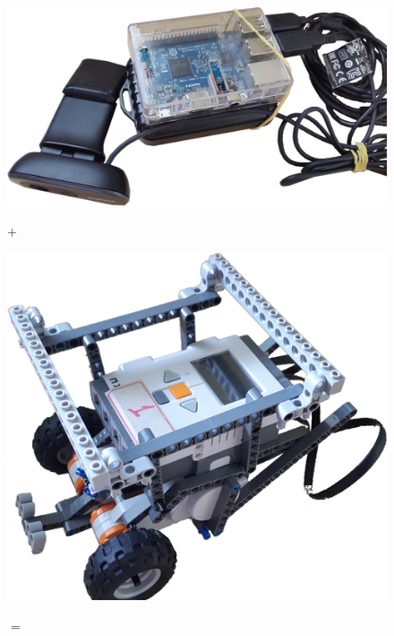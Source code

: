 \documentclass{beamer}
\begin{document}
\begin{frame}
  \begin{figure}
    \centering
    \begin{minipage}{0.3\textwidth}
      \includegraphics[width=\linewidth]{imgs/berry.png}
    \end{minipage}
    $+$
    \begin{minipage}{0.3\textwidth}
      \includegraphics[width=\linewidth]{imgs/brick.png}
    \end{minipage}
    $=$
    \begin{minipage}{0.3\textwidth}

\end{minipage}
\end{figure}
\end{frame}
\end{document}
